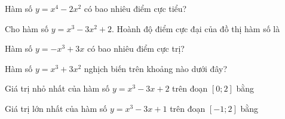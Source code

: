 \documentclass{exam}
\begin{document}
\makeheader


\begin{question}
Hàm số $y = x^4 - 2x^2$ có bao nhiêu điểm cực tiểu?





\end{question}




\begin{question}
Cho hàm số $y = x^3 - 3x^2 + 2$. Hoành độ điểm cực đại của đồ thị hàm số là





\end{question}




\begin{question}
Hàm số $y = -x^3 + 3x$ có bao nhiêu điểm cực trị?





\end{question}




\begin{question}
Hàm số $y = x^3 + 3x^2$ nghịch biến trên khoảng nào dưới đây?





\end{question}




\begin{question}
Giá trị nhỏ nhất của hàm số $y = x^3 - 3x + 2$ trên đoạn $[0; 2]$ bằng





\end{question}




\begin{question}
Giá trị lớn nhất của hàm số $y = x^3 - 3x + 1$ trên đoạn $[-1; 2]$ bằng





\end{question}
\end{document}
